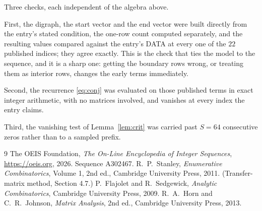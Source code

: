 \documentclass[11pt,a4paper]{article}
\theoremstyle{plain}
\theoremstyle{definition}
\begin{document}
Three checks, each independent of the algebra above.

First, the digraph, the start vector and the end vector were built directly from the
entry's stated condition, the one-row count computed separately, and the resulting values
compared against the entry's DATA at every one of the $22$ published indices; they
agree exactly. This is the check that ties the model to the sequence, and it is a sharp one:
getting the boundary rows wrong, or treating them as interior rows, changes the early terms
immediately.

Second, the recurrence \eqref{eq:conj} was evaluated on those published terms in exact
integer arithmetic, with no matrices involved, and vanishes at every index the entry claims.

Third, the vanishing test of Lemma~\ref{lem:crit} was carried past $S=64$ consecutive
zeros rather than to a sampled prefix.

\begin{thebibliography}{9}
 The OEIS Foundation, \emph{The On-Line Encyclopedia of Integer
Sequences}, \url{https://oeis.org}, 2026. Sequence A302467.
 R.~P.~Stanley, \emph{Enumerative Combinatorics}, Volume 1, 2nd ed.,
Cambridge University Press, 2011. (Transfer-matrix method, Section 4.7.)
 P.~Flajolet and R.~Sedgewick, \emph{Analytic Combinatorics}, Cambridge
University Press, 2009.
 R.~A.~Horn and C.~R.~Johnson, \emph{Matrix Analysis}, 2nd ed., Cambridge
University Press, 2013.
\end{thebibliography}
\end{document}

